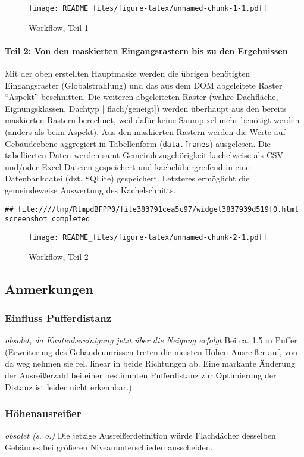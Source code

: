 \documentclass[
]{article}
\begin{document}
\begin{figure}
\centering
\texttt{[image: README\_files/figure-latex/unnamed-chunk-1-1.pdf]}
\caption{Workflow, Teil 1}
\end{figure}

\paragraph{Teil 2: Von den maskierten Eingangsrastern bis zu den
Ergebnissen}\label{teil-2-von-den-maskierten-eingangsrastern-bis-zu-den-ergebnissen}

Mit der oben erstellten Hauptmaske werden die übrigen benötigten
Eingangsraster (Globalstrahlung) und das aus dem DOM abgeleitete Raster
``Aspekt'' beschnitten. Die weiteren abgeleiteten Raster (wahre
Dachfläche, Eignungsklassen, Dachtyp {[} flach/geneigt{]}) werden
überhaupt aus den bereits maskierten Rastern berechnet, weil dafür keine
Saumpixel mehr benötigt werden (anders als beim Aspekt). Aus den
maskierten Rastern werden die Werte auf Gebäudeebene aggregiert in
Tabellenform (\texttt{data.frames}) ausgelesen. Die tabellierten Daten
werden samt Gemeindezugehörigkeit kachelweise als CSV und/oder
Excel-Dateien gespeichert und kachelübergreifend in eine Datenbankdatei
(dzt. SQLite) gespeichert. Letzteres ermöglicht die gemeindeweise
Auswertung des Kachelschnitts.

\begin{verbatim}
## file:////tmp/RtmpdBFPP0/file383791cea5c97/widget3837939d519f0.html screenshot completed
\end{verbatim}

\begin{figure}
\centering
\texttt{[image: README\_files/figure-latex/unnamed-chunk-2-1.pdf]}
\caption{Workflow, Teil 2}
\end{figure}

\subsection{Anmerkungen}\label{anmerkungen}

\subsubsection{Einfluss Pufferdistanz}\label{einfluss-pufferdistanz}

\emph{obsolet, da Kantenbereinigung jetzt über die Neigung erfolgt} Bei
ca. 1,5 m Puffer (Erweiterung des Gebäudeumrissen treten die meisten
Höhen-Ausreißer auf, von da weg nehmen sie rel. linear in beide
Richtungen ab. Eine markante Änderung der Ausreißerzahl bei einer
bestimmten Pufferdistanz zur Optimierung der Distanz ist leider nicht
erkennbar.)

\subsubsection{Höhenausreißer}\label{huxf6henausreiuxdfer}

\emph{obsolet (s. o.)} Die jetzige Ausreißerdefinition würde Flachdächer
desselben Gebäudes bei größeren Niveauunterschieden ausscheiden.
\end{document}
